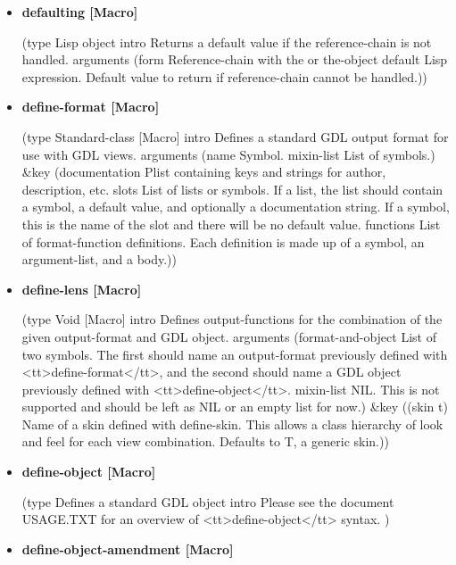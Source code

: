 \documentclass [11pt]{book}
\begin{document}
\begin{itemize}
\item {}
\label{prim:defaulting}
\textbf{defaulting [Macro]}

(type Lisp object intro
  Returns a default value if the reference-chain is not handled.
 arguments
 (form Reference-chain with the or the-object default
  Lisp expression. Default value to return if reference-chain cannot be handled.))



\item {}
\label{prim:define-format}
\textbf{define-format [Macro]}

(type Standard-class [Macro] intro
  Defines a standard GDL output format for use with GDL views.
 arguments (name Symbol. mixin-list List of symbols.) \&key
 (documentation Plist containing keys and strings for author, description, etc.
                slots
                List of lists or symbols. If a list, the list should contain a symbol, a default value, and optionally a documentation string. If
a symbol, this is the name of the slot and there will be no default value.
                functions
                List of format-function definitions. Each definition is made up of a symbol, an argument-list, and a body.))



\item {}
\label{prim:define-lens}
\textbf{define-lens [Macro]}

(type Void [Macro] intro
  Defines output-functions for the combination of the given output-format and GDL object.
 arguments
 (format-and-object
  List of two symbols. The first should name an output-format previously 
defined with <tt>define-format</tt>, and the second should name a GDL object previously defined with <tt>define-object</tt>.
  mixin-list
  NIL. This is not supported and should be left as NIL or an empty list for now.)
 \&key
 ((skin t)
  Name of a skin defined with define-skin. This allows a class hierarchy of look and feel for each view combination. Defaults to T, a generic skin.))



\item {}
\label{prim:define-object}
\textbf{define-object [Macro]}

(type Defines a standard GDL object intro
  Please see the document USAGE.TXT for an
overview of <tt>define-object</tt> syntax.
)



\item {}
\label{prim:define-object-amendment}
\textbf{define-object-amendment [Macro]}


\end{itemize}
\end{document}
